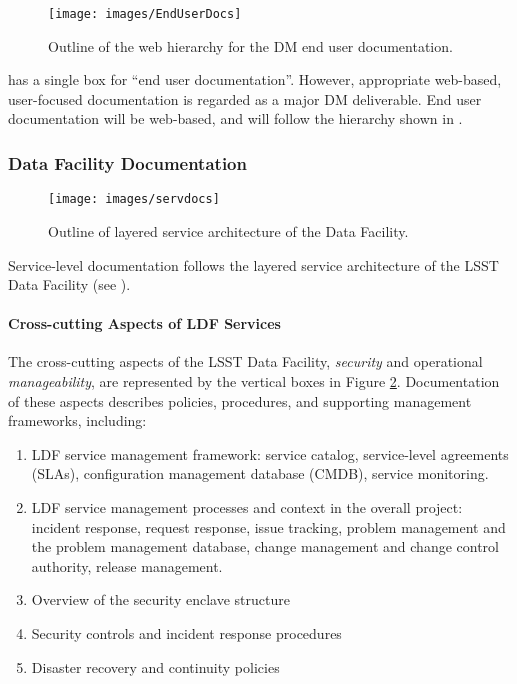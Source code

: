 \begin{figure}
\begin{center}
 \texttt{[image: images/EndUserDocs]}
\caption{Outline of the web hierarchy for the \gls{DM} end user documentation. \label{fig:eudoc}}
\end{center}
\end{figure}

 has a single box for ``end user documentation''. However, appropriate web-based, user-focused documentation is regarded as a major \gls{DM} deliverable.
End user documentation will be web-based, and will follow the hierarchy shown in .

\subsubsection{Data Facility Documentation}

\begin{figure}
\begin{center}
 \texttt{[image: images/servdocs]}
\caption{Outline of layered service architecture of the Data Facility. \label{fig:servdoc}}
\end{center}
\end{figure}

Service-level documentation follows the layered service architecture of the \gls{LSST} Data Facility (see ).

\paragraph{Cross-cutting Aspects of \gls{LDF} Services}

The cross-cutting aspects of the \gls{LSST} Data Facility, \textit{security} and operational \textit{manageability}, are represented by the vertical boxes in Figure \ref{fig:servdoc}.
Documentation of these aspects describes policies, procedures, and supporting management frameworks, including:

\begin{enumerate}
	\item	\gls{LDF} service management framework: service catalog, service-level agreements (SLAs), \gls{configuration} management database (\gls{CMDB}), service \gls{monitoring}.
	\item	LDF service management processes and context in the overall project: incident response, request response, issue tracking, problem management and the problem management database, change management and change control authority, release management.
	\item	Overview of the security enclave structure
	\item	Security controls and incident response procedures
	\item	Disaster recovery and continuity policies
\end{enumerate}

